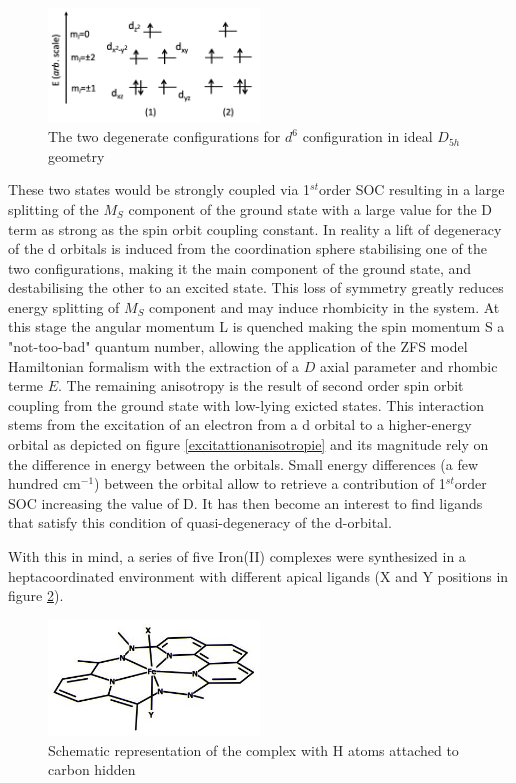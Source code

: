 \documentclass[10pt]{report}
\numberwithin{equation}{section}
\begin{document}
\begin{figure}[h!]
    \centering
    \includegraphics[width=0.5\textwidth]{Images/DiagOrbFed6.png}
    \caption{The two degenerate configurations for $d^6$ configuration in ideal $D_{5h}$ geometry}
    \label{Fer_config}
\end{figure}

These two states would be strongly coupled via 1$^{st}$order SOC resulting in a large splitting of the $M_S$ component of the ground state with a large value for the D term as strong as the spin orbit coupling constant.
In reality a lift of degeneracy of the d orbitals is induced from the coordination sphere stabilising one of the two configurations, making it the main component of the ground state, and destabilising the other to an excited state.
This loss of symmetry greatly reduces energy splitting of $M_S$ component and may induce rhombicity in the system. 
At this stage the angular momentum L is quenched making the spin momentum S a "not-too-bad" quantum number, allowing the application of the ZFS model Hamiltonian formalism with the extraction of a $D$ axial parameter and rhombic terme $E$.
The remaining anisotropy is the result of second order spin orbit coupling from the ground state with low-lying exicted states.
This interaction stems from the excitation of an electron from a d orbital to a higher-energy orbital as depicted on figure \ref{excitattionanisotropie} and its magnitude rely on the difference in energy between the orbitals.
Small energy differences (a few hundred cm$^{-1}$) between the orbital allow to retrieve a contribution of 1$^{st}$order SOC increasing the value of D.
It has then become an interest to find ligands that satisfy this condition of quasi-degeneracy of the d-orbital.

With this in mind, a series of five Iron(II) complexes were synthesized in a heptacoordinated environment with different apical ligands (X and Y positions in figure \ref{FeComplex}).

\begin{figure}[h!]
    \centering
    \includegraphics[width=0.5\textwidth]{Images/ComplexFe.XY.jpg}
    \caption{Schematic representation of the complex with H atoms attached to carbon hidden}
    \label{FeComplex}
\end{figure}
\end{document}
